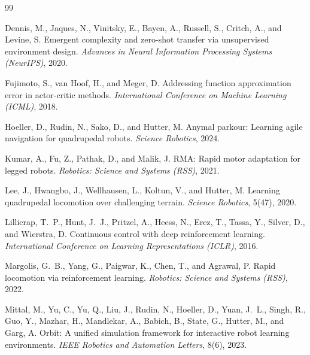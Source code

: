 \documentclass{article}
\begin{document}

\begin{thebibliography}{99}

Dennis, M., Jaques, N., Vinitsky, E., Bayen, A., Russell, S., Critch, A.,
and Levine, S.
\newblock Emergent complexity and zero-shot transfer via unsupervised
environment design.
\newblock \emph{Advances in Neural Information Processing Systems (NeurIPS)},
2020.

Fujimoto, S., van Hoof, H., and Meger, D.
\newblock Addressing function approximation error in actor-critic methods.
\newblock \emph{International Conference on Machine Learning (ICML)}, 2018.

Hoeller, D., Rudin, N., Sako, D., and Hutter, M.
\newblock Anymal parkour: Learning agile navigation for quadrupedal robots.
\newblock \emph{Science Robotics}, 2024.

Kumar, A., Fu, Z., Pathak, D., and Malik, J.
\newblock RMA: Rapid motor adaptation for legged robots.
\newblock \emph{Robotics: Science and Systems (RSS)}, 2021.

Lee, J., Hwangbo, J., Wellhausen, L., Koltun, V., and Hutter, M.
\newblock Learning quadrupedal locomotion over challenging terrain.
\newblock \emph{Science Robotics}, 5(47), 2020.

Lillicrap, T.~P., Hunt, J.~J., Pritzel, A., Heess, N., Erez, T., Tassa, Y.,
Silver, D., and Wierstra, D.
\newblock Continuous control with deep reinforcement learning.
\newblock \emph{International Conference on Learning Representations (ICLR)},
2016.

Margolis, G.~B., Yang, G., Paigwar, K., Chen, T., and Agrawal, P.
\newblock Rapid locomotion via reinforcement learning.
\newblock \emph{Robotics: Science and Systems (RSS)}, 2022.

Mittal, M., Yu, C., Yu, Q., Liu, J., Rudin, N., Hoeller, D., Yuan, J.~L.,
Singh, R., Guo, Y., Mazhar, H., Mandlekar, A., Babich, B., State, G.,
Hutter, M., and Garg, A.
\newblock Orbit: A unified simulation framework for interactive robot learning
environments.
\newblock \emph{IEEE Robotics and Automation Letters}, 8(6), 2023.


\end{thebibliography}
\end{document}
